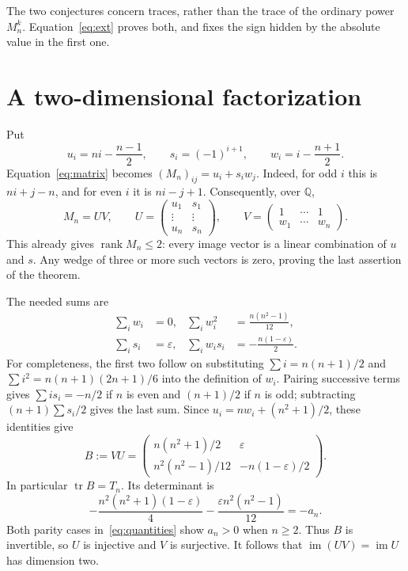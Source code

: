 \documentclass[11pt]{article}
\DeclareMathOperator{\tr}{tr}
\DeclareMathOperator{\rank}{rank}
\newcommand{\eps}{\varepsilon}
\begin{document}
The two conjectures concern traces, rather than the trace of the ordinary
power $M_n^k$. Equation~\eqref{eq:ext} proves both, and fixes the sign
hidden by the absolute value in the first one.

\section{A two-dimensional factorization}
Put
\[
u_i=ni-\frac{n-1}{2},\qquad s_i=(-1)^{i+1},\qquad
w_i=i-\frac{n+1}{2}.
\]
Equation~\eqref{eq:matrix} becomes $(M_n)_{ij}=u_i+s_iw_j$.
Indeed, for odd $i$ this is $ni+j-n$, and for even $i$ it is $ni-j+1$.
Consequently, over $\mathbb Q$,
\begin{equation}\label{eq:factor}
M_n=UV,\qquad
U=\begin{pmatrix}u_1&s_1\\\vdots&\vdots\\u_n&s_n\end{pmatrix},
\qquad V=\begin{pmatrix}1&\cdots&1\\w_1&\cdots&w_n\end{pmatrix}.
\end{equation}
This already gives $\rank M_n\leq2$: every image vector is a linear
combination of $u$ and $s$. Any wedge of three or more such vectors is
zero, proving the last assertion of the theorem.

The needed sums are
\begin{align*}
\sum_i w_i&=0,&\sum_i w_i^2&=\frac{n(n^2-1)}{12},\\
\sum_i s_i&=\eps,&\sum_i w_is_i&=-\frac{n(1-\eps)}2.
\end{align*}
For completeness, the first two follow on substituting
$\sum i=n(n+1)/2$ and $\sum i^2=n(n+1)(2n+1)/6$ into the definition
of $w_i$. Pairing successive terms gives
$\sum i s_i=-n/2$ if $n$ is even and $(n+1)/2$ if $n$ is odd;
subtracting $(n+1)\sum s_i/2$ gives the last sum.
Since $u_i=nw_i+(n^2+1)/2$, these identities give
\begin{equation}\label{eq:small}
B:=VU=\begin{pmatrix}
 n(n^2+1)/2&\eps\\
 n^2(n^2-1)/12&-n(1-\eps)/2
\end{pmatrix}.
\end{equation}
In particular $\tr B=T_n$. Its determinant is
\[
-\frac{n^2(n^2+1)(1-\eps)}4
-\frac{\eps n^2(n^2-1)}{12}=-a_n.
\]
Both parity cases in~\eqref{eq:quantities} show $a_n>0$ when $n\geq2$.
Thus $B$ is invertible, so $U$ is injective and $V$ is surjective.
It follows that $\operatorname{im}(UV)=\operatorname{im}U$ has dimension two.
\end{document}
